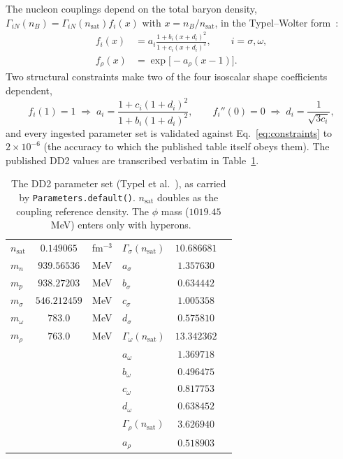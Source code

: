 \documentclass[aps,prc,onecolumn,superscriptaddress,nofootinbib,10pt]{revtex4-2}
\newcommand{\nB}{n_B}
\newcommand{\nsat}{n_{\mathrm{sat}}}
\begin{document}
The nucleon couplings depend on the total baryon density,
$\Gamma_{iN}(\nB) = \Gamma_{iN}(\nsat) f_i(x)$ with $x = \nB/\nsat$, in the
Typel--Wolter form~\cite{TypelWolter1999,Typel2010}:
%
\begin{align}
f_i(x) &= a_i \frac{1 + b_i (x + d_i)^2}{1 + c_i (x + d_i)^2},
  \qquad i = \sigma, \omega,
\label{eq:frational}\\
f_\rho(x) &= \exp\!\big[ -a_\rho (x - 1) \big].
\label{eq:fexp}
\end{align}
%
Two structural constraints make two of the four isoscalar shape coefficients
dependent,
%
\begin{equation}
f_i(1) = 1 \;\Rightarrow\; a_i = \frac{1 + c_i (1+d_i)^2}{1 + b_i (1+d_i)^2},
\qquad
f_i''(0) = 0 \;\Rightarrow\; d_i = \frac{1}{\sqrt{3 c_i}} ,
\label{eq:constraints}
\end{equation}
%
and every ingested parameter set is validated against
Eq.~\eqref{eq:constraints} to $2\times 10^{-6}$ (the accuracy to which the
published table itself obeys them). The published DD2 values
\cite{Typel2010} are transcribed verbatim in
Table~\ref{tab:params}.

\begin{table}[b]
\caption{The DD2 parameter set (Typel et al.~\cite{Typel2010}), as carried by
\texttt{Parameters.default()}. $\nsat$ doubles as the
coupling reference density. The $\phi$ mass ($1019.45$~MeV) enters only with
hyperons.}
\label{tab:params}
\begin{ruledtabular}
\begin{tabular}{lcc|lcc}
$\nsat$ & $0.149065$ & fm$^{-3}$ & $\Gamma_\sigma(\nsat)$ & $10.686681$ & \\
$m_n$   & $939.56536$ & MeV      & $a_\sigma$ & $1.357630$ & \\
$m_p$   & $938.27203$ & MeV      & $b_\sigma$ & $0.634442$ & \\
$m_\sigma$ & $546.212459$ & MeV  & $c_\sigma$ & $1.005358$ & \\
$m_\omega$ & $783.0$ & MeV       & $d_\sigma$ & $0.575810$ & \\
$m_\rho$   & $763.0$ & MeV       & $\Gamma_\omega(\nsat)$ & $13.342362$ & \\
 & & & $a_\omega$ & $1.369718$ & \\
 & & & $b_\omega$ & $0.496475$ & \\
 & & & $c_\omega$ & $0.817753$ & \\
 & & & $d_\omega$ & $0.638452$ & \\
 & & & $\Gamma_\rho(\nsat)$ & $3.626940$ & \\
 & & & $a_\rho$ & $0.518903$ & \\
\end{tabular}
\end{ruledtabular}
\end{table}
\end{document}
